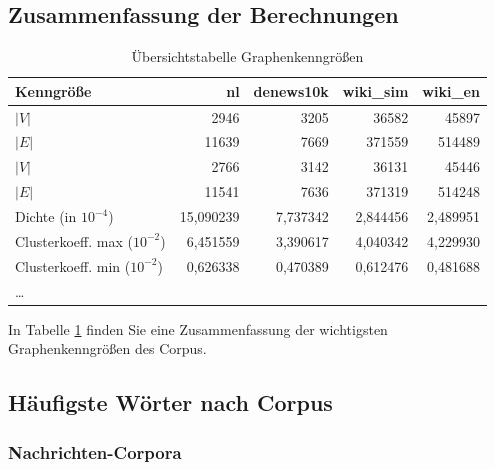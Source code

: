 \documentclass[11pt, a4paper]{article}
\begin{document}
\subsection{Zusammenfassung der Berechnungen}
\begin{table}
    \begin{tabular}{l*{4}{r}}
    \toprule
    Kenngröße & nl & denews10k & wiki\_sim & wiki\_en \\
    \midrule
    $|V|$     & 2946  & 3205 & 36582  & 45897  \\
    $|E|$     & 11639 & 7669 & 371559 & 514489 \\
    $|V|$\footnotemark[6] & 2766  & 3142 & 36131  & 45446  \\
    $|E|$\footnotemark[6]    & 11541 & 7636 & 371319 & 514248 \\
    Dichte (in $10^{-4}$) & 15,090239 & 7,737342 & 2,844456 & 2,489951 \\
    Clusterkoeff. max ($10^{-2}$) & 6,451559 & 3,390617 & 4,040342 & 4,229930 \\
    Clusterkoeff. min ($10^{-2}$) & 0,626338 & 0,470389 & 0,612476 & 0,481688 \\
    \dots     &       &       &       &       \\
    \bottomrule
    \end{tabular}
    \caption{Übersichtstabelle Graphenkenngrößen}
    \label{tab-zsf}
\end{table}

In Tabelle \ref{tab-zsf} finden Sie eine Zusammenfassung der wichtigsten Graphenkenngrößen des Corpus.



\subsection{H\"aufigste W\"orter nach Corpus}

\subsubsection{Nachrichten-Corpora}
\end{document}
